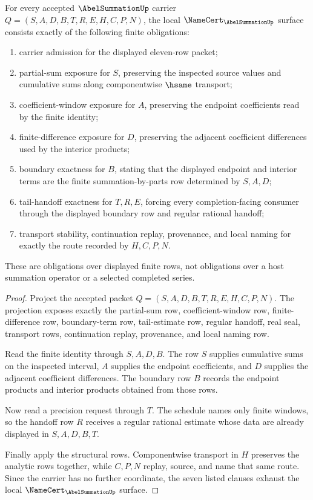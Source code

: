 \begin{theorem}
\label{thm:abel-summation-namecert-obligations}
For every accepted $\AbelSummationUp$ carrier $Q=(S,A,D,B,T,R,E,H,C,P,N)$, the local $\NameCert_{\AbelSummationUp}$ surface consists exactly of the following finite obligations:
\begin{enumerate}
\item carrier admission for the displayed eleven-row packet;
\item partial-sum exposure for $S$, preserving the inspected source values and cumulative sums along componentwise $\hsame$ transport;
\item coefficient-window exposure for $A$, preserving the endpoint coefficients read by the finite identity;
\item finite-difference exposure for $D$, preserving the adjacent coefficient differences used by the interior products;
\item boundary exactness for $B$, stating that the displayed endpoint and interior terms are the finite summation-by-parts row determined by $S,A,D$;
\item tail-handoff exactness for $T,R,E$, forcing every completion-facing consumer through the displayed boundary row and regular rational handoff;
\item transport stability, continuation replay, provenance, and local naming for exactly the route recorded by $H,C,P,N$.
\end{enumerate}
These are obligations over displayed finite rows, not obligations over a host summation operator or a selected completed series.
\end{theorem}
\begin{proof}
Project the accepted packet $Q=(S,A,D,B,T,R,E,H,C,P,N)$. The projection exposes exactly the partial-sum row, coefficient-window row, finite-difference row, boundary-term row, tail-estimate row, regular handoff, real seal, transport rows, continuation replay, provenance, and local naming row.

Read the finite identity through $S,A,D,B$. The row $S$ supplies cumulative sums on the inspected interval, $A$ supplies the endpoint coefficients, and $D$ supplies the adjacent coefficient differences. The boundary row $B$ records the endpoint products and interior products obtained from those rows.

Now read a precision request through $T$. The schedule names only finite windows, so the handoff row $R$ receives a regular rational estimate whose data are already displayed in $S,A,D,B,T$.

Finally apply the structural rows. Componentwise transport in $H$ preserves the analytic rows together, while $C,P,N$ replay, source, and name that same route. Since the carrier has no further coordinate, the seven listed clauses exhaust the local $\NameCert_{\AbelSummationUp}$ surface.
\end{proof}

